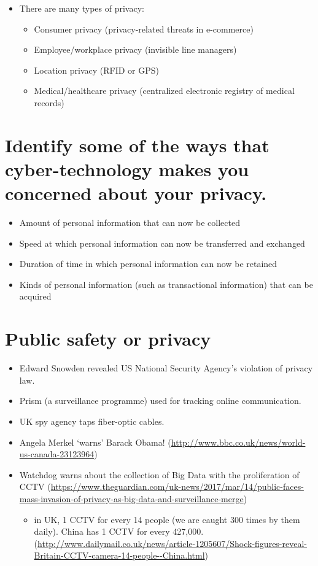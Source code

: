 \documentclass{article}
\begin{document}
\begin{itemize}
\item There are many types of privacy:
\begin{itemize}
\item Consumer privacy (privacy-related threats in e-commerce)
\item Employee/workplace privacy (invisible line managers)
\item Location privacy (RFID or GPS)
\item Medical/healthcare privacy (centralized electronic registry of medical records)
\end{itemize}
\end{itemize}



\section{Identify some of the ways that cyber-technology makes you concerned about your privacy.}
\begin{itemize}
\item Amount of personal information that can now be collected
\item Speed at which personal information can now be transferred and exchanged
\item Duration of time in which personal information can now be retained
\item Kinds of personal information (such as transactional information) that can be acquired
\end{itemize}



\section{Public safety or privacy}
\begin{itemize}
\item Edward Snowden revealed US National Security Agency's violation of privacy law.
\item Prism (a surveillance programme) used for tracking online communication.
\item UK spy agency taps fiber-optic cables.
\item Angela Merkel `warns' Barack Obama! (\url{http://www.bbc.co.uk/news/world-us-canada-23123964})
\item Watchdog warns about the collection of Big Data with the proliferation of CCTV (\url{https://www.theguardian.com/uk-news/2017/mar/14/public-faces-mass-invasion-of-privacy-as-big-data-and-surveillance-merge}) 
\begin{itemize}
\item in UK, 1 CCTV for every 14 people (we are caught 300 times by them daily).  China has 1 CCTV for every 427,000. (\url{http://www.dailymail.co.uk/news/article-1205607/Shock-figures-reveal-Britain-CCTV-camera-14-people--China.html})
\end{itemize}
\end{itemize}
\end{document}
